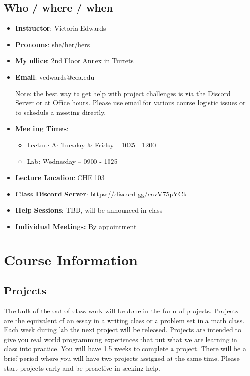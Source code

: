 \documentclass[12pt]{article}
\begin{document}
\subsection{Who / where / when}
\begin{itemize}
\item \textbf{Instructor}: Victoria Edwards
\item \textbf{Pronouns}: she/her/hers
\item \textbf{My office}: 2nd Floor Annex in Turrets
\item \textbf{Email}: vedwards@coa.edu

  Note: the best way to get help with project challenges is via the Discord Server or at Office hours. Please use email for various course logistic issues or to schedule a meeting directly. 
\item \textbf{Meeting Times}:
  \begin{itemize}
  \item Lecture A: Tuesday \& Friday -- 1035 - 1200
  \item Lab: Wednesday -- 0900 - 1025 
  \end{itemize}
\item \textbf{Lecture Location}: CHE 103
\item \textbf{Class Discord Server}: \url{https://discord.gg/cavV75pYCk}
\item \textbf{Help Sessions}: TBD, will be announced in class 
\item \textbf{Individual Meetings:} By appointment
\end{itemize}

\section{Course Information}


\subsection{Projects}
The bulk of the out of class work will be done in the form of projects.
Projects are the equivalent of an essay in a writing class or a problem set in a math class.
Each week during lab the next project will be released.
Projects are intended to give you real world programming experiences that put what we are learning in class into practice.
You will have 1.5 weeks to complete a project.
There will be a brief period where you will have two projects assigned at the same time.
Please start projects early and be proactive in seeking help. 
\end{document}
